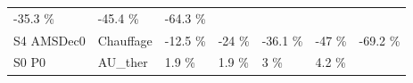 \documentclass[]{article}
\begin{document}
\begin{longtable}[]{@{}lllllll@{}}
\begin{minipage}[t]{0.11\columnwidth}
-35.3 \%\strut
\end{minipage} & \begin{minipage}[t]{0.11\columnwidth}\raggedright\strut
-45.4 \%\strut
\end{minipage} & \begin{minipage}[t]{0.11\columnwidth}\raggedright\strut
-64.3 \%\strut
\end{minipage}\tabularnewline
\begin{minipage}[t]{0.14\columnwidth}\raggedright\strut
S4 AMSDec0\strut
\end{minipage} & \begin{minipage}[t]{0.13\columnwidth}\raggedright\strut
Chauffage\strut
\end{minipage} & \begin{minipage}[t]{0.11\columnwidth}\raggedright\strut
-12.5 \%\strut
\end{minipage} & \begin{minipage}[t]{0.11\columnwidth}\raggedright\strut
-24 \%\strut
\end{minipage} & \begin{minipage}[t]{0.11\columnwidth}\raggedright\strut
-36.1 \%\strut
\end{minipage} & \begin{minipage}[t]{0.11\columnwidth}\raggedright\strut
-47 \%\strut
\end{minipage} & \begin{minipage}[t]{0.11\columnwidth}\raggedright\strut
-69.2 \%\strut
\end{minipage}\tabularnewline
\begin{minipage}[t]{0.14\columnwidth}\raggedright\strut
S0 P0\strut
\end{minipage} & \begin{minipage}[t]{0.13\columnwidth}\raggedright\strut
AU\_ther\strut
\end{minipage} & \begin{minipage}[t]{0.11\columnwidth}\raggedright\strut
1.9 \%\strut
\end{minipage} & \begin{minipage}[t]{0.11\columnwidth}\raggedright\strut
1.9 \%\strut
\end{minipage} & \begin{minipage}[t]{0.11\columnwidth}\raggedright\strut
3 \%\strut
\end{minipage} & \begin{minipage}[t]{0.11\columnwidth}\raggedright\strut
4.2 \%\strut
\end{minipage} & \begin{minipage}[t]{0.11\columnwidth}\raggedright\strut

\end{minipage}
\end{longtable}
\end{document}

